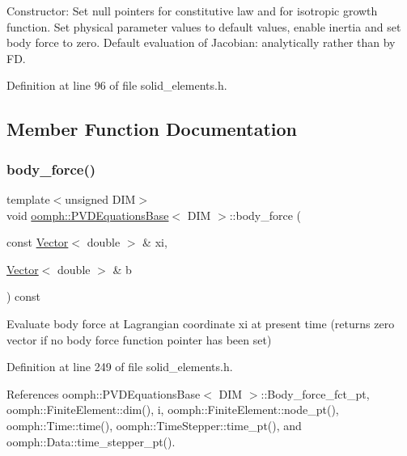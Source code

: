 Constructor\+: Set null pointers for constitutive law and for isotropic growth function. Set physical parameter values to default values, enable inertia and set body force to zero. Default evaluation of Jacobian\+: analytically rather than by FD. 



Definition at line 96 of file solid\+\_\+elements.\+h.



\subsection{Member Function Documentation}
\mbox{\label{classoomph_1_1PVDEquationsBase_add35ffbc2d8984fae27c4e1fb4c90b46}} 
\subsubsection{\texorpdfstring{body\+\_\+force()}{body\_force()}}
{\footnotesize\ttfamily template$<$unsigned D\+IM$>$ \\
void \hyperlink{classoomph_1_1PVDEquationsBase}{oomph\+::\+P\+V\+D\+Equations\+Base}$<$ D\+IM $>$\+::body\+\_\+force (\begin{DoxyParamCaption}\item[{const \hyperlink{classoomph_1_1Vector}{Vector}$<$ double $>$ \&}]{xi,  }\item[{\hyperlink{classoomph_1_1Vector}{Vector}$<$ double $>$ \&}]{b }\end{DoxyParamCaption}) const\hspace{0.3cm}{\ttfamily [inline]}}



Evaluate body force at Lagrangian coordinate xi at present time (returns zero vector if no body force function pointer has been set) 



Definition at line 249 of file solid\+\_\+elements.\+h.



References oomph\+::\+P\+V\+D\+Equations\+Base$<$ D\+I\+M $>$\+::\+Body\+\_\+force\+\_\+fct\+\_\+pt, oomph\+::\+Finite\+Element\+::dim(), i, oomph\+::\+Finite\+Element\+::node\+\_\+pt(), oomph\+::\+Time\+::time(), oomph\+::\+Time\+Stepper\+::time\+\_\+pt(), and oomph\+::\+Data\+::time\+\_\+stepper\+\_\+pt().

